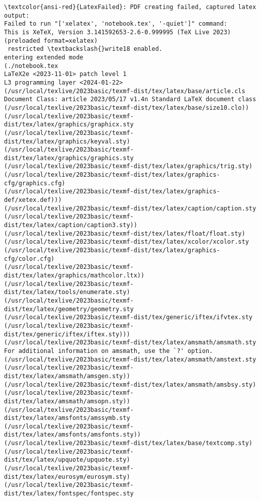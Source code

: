 \documentclass[11pt]{article}
\begin{document}
\begin{Verbatim}[commandchars=\\\{\}, frame=single, framerule=2mm, rulecolor=\color{outerrorbackground}]
\textcolor{ansi-red}{LatexFailed}: PDF creating failed, captured latex output:
Failed to run "['xelatex', 'notebook.tex', '-quiet']" command:
This is XeTeX, Version 3.141592653-2.6-0.999995 (TeX Live 2023) (preloaded format=xelatex)
 restricted \textbackslash{}write18 enabled.
entering extended mode
(./notebook.tex
LaTeX2e <2023-11-01> patch level 1
L3 programming layer <2024-01-22>
(/usr/local/texlive/2023basic/texmf-dist/tex/latex/base/article.cls
Document Class: article 2023/05/17 v1.4n Standard LaTeX document class
(/usr/local/texlive/2023basic/texmf-dist/tex/latex/base/size10.clo))
(/usr/local/texlive/2023basic/texmf-dist/tex/latex/graphics/graphicx.sty
(/usr/local/texlive/2023basic/texmf-dist/tex/latex/graphics/keyval.sty)
(/usr/local/texlive/2023basic/texmf-dist/tex/latex/graphics/graphics.sty
(/usr/local/texlive/2023basic/texmf-dist/tex/latex/graphics/trig.sty)
(/usr/local/texlive/2023basic/texmf-dist/tex/latex/graphics-cfg/graphics.cfg)
(/usr/local/texlive/2023basic/texmf-dist/tex/latex/graphics-def/xetex.def)))
(/usr/local/texlive/2023basic/texmf-dist/tex/latex/caption/caption.sty
(/usr/local/texlive/2023basic/texmf-dist/tex/latex/caption/caption3.sty))
(/usr/local/texlive/2023basic/texmf-dist/tex/latex/float/float.sty)
(/usr/local/texlive/2023basic/texmf-dist/tex/latex/xcolor/xcolor.sty
(/usr/local/texlive/2023basic/texmf-dist/tex/latex/graphics-cfg/color.cfg)
(/usr/local/texlive/2023basic/texmf-dist/tex/latex/graphics/mathcolor.ltx))
(/usr/local/texlive/2023basic/texmf-dist/tex/latex/tools/enumerate.sty)
(/usr/local/texlive/2023basic/texmf-dist/tex/latex/geometry/geometry.sty
(/usr/local/texlive/2023basic/texmf-dist/tex/generic/iftex/ifvtex.sty
(/usr/local/texlive/2023basic/texmf-dist/tex/generic/iftex/iftex.sty)))
(/usr/local/texlive/2023basic/texmf-dist/tex/latex/amsmath/amsmath.sty
For additional information on amsmath, use the `?' option.
(/usr/local/texlive/2023basic/texmf-dist/tex/latex/amsmath/amstext.sty
(/usr/local/texlive/2023basic/texmf-dist/tex/latex/amsmath/amsgen.sty))
(/usr/local/texlive/2023basic/texmf-dist/tex/latex/amsmath/amsbsy.sty)
(/usr/local/texlive/2023basic/texmf-dist/tex/latex/amsmath/amsopn.sty))
(/usr/local/texlive/2023basic/texmf-dist/tex/latex/amsfonts/amssymb.sty
(/usr/local/texlive/2023basic/texmf-dist/tex/latex/amsfonts/amsfonts.sty))
(/usr/local/texlive/2023basic/texmf-dist/tex/latex/base/textcomp.sty)
(/usr/local/texlive/2023basic/texmf-dist/tex/latex/upquote/upquote.sty)
(/usr/local/texlive/2023basic/texmf-dist/tex/latex/eurosym/eurosym.sty)
(/usr/local/texlive/2023basic/texmf-dist/tex/latex/fontspec/fontspec.sty

\end{Verbatim}
\end{document}

